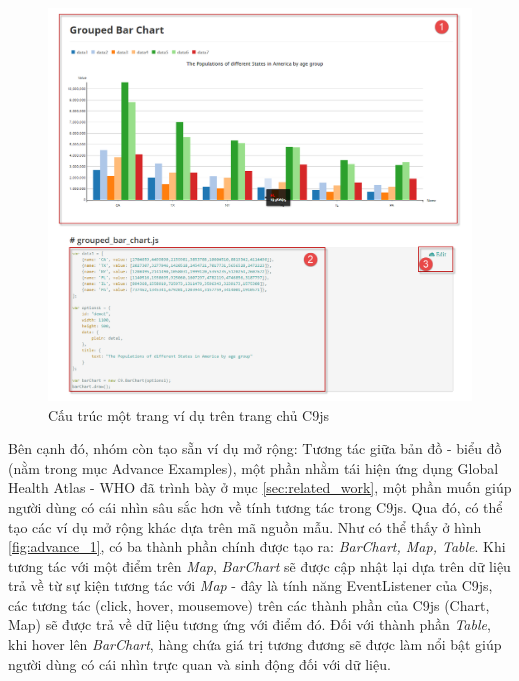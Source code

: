 \documentclass[12pt,a4paper]{article}
\begin{document}
\begin{figure}[htp]
	\begin{center}
    \includegraphics[scale=.5]{image/example_page_2}
    \caption{Cấu trúc một trang ví dụ trên trang chủ C9js}
    \label{fig:example_page_2}
	\end{center}
\end{figure}

Bên cạnh đó, nhóm còn tạo sẵn ví dụ mở rộng: Tương tác giữa bản đồ - biểu đồ (nằm trong mục Advance Examples), một phần nhằm tái hiện ứng dụng Global Health Atlas - WHO\cite{einstein} đã trình bày ở mục \ref{sec:related_work}, một phần muốn giúp người dùng có cái nhìn sâu sắc hơn về tính tương tác trong C9js. Qua đó, có thể tạo các ví dụ mở rộng khác dựa trên mã nguồn mẫu. Như có thể thấy ở hình \ref{fig:advance_1}, có ba thành phần chính được tạo ra: \textit{BarChart, Map, Table}. Khi tương tác với một điểm trên \textit{Map}, \textit{BarChart} sẽ được cập nhật lại dựa trên dữ liệu trả về từ sự kiện tương tác với \textit{Map} - đây là tính năng EventListener của C9js, các tương tác (click, hover, mousemove) trên các thành phần của C9js (Chart, Map) sẽ được trả về dữ liệu tương ứng với điểm đó. Đối với thành phần \textit{Table}, khi hover lên \textit{BarChart}, hàng chứa giá trị tương đương sẽ được làm nổi bật giúp người dùng có cái nhìn trực quan và sinh động đối với dữ liệu.
\end{document}

